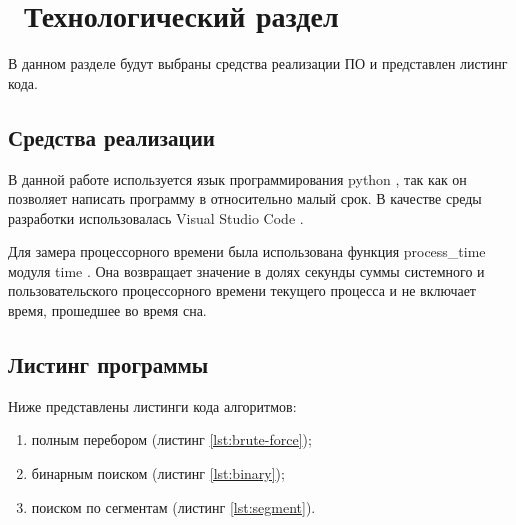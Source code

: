 \chapter{ Технологический раздел}
\label{cha:technological}

    В данном разделе будут выбраны средства реализации ПО и представлен листинг кода. 

    \section{Средства реализации}
        В данной работе используется язык программирования python \cite{python}, так как
        он позволяет написать программу в относительно малый срок.
        В качестве среды разработки использовалась Visual Studio Code \cite{visual-studio-code}. 

        Для замера процессорного времени была использована функция process\_time модуля time \cite{process_time}. 
        Она возвращает значение в долях секунды суммы системного и пользовательского процессорного времени текущего процесса и 
        не включает время, прошедшее во время сна.

    \section{Листинг программы}
        Ниже представлены листинги кода алгоритмов:
        \begin{enumerate}
            \item полным перебором (листинг \ref{lst:brute-force});
            \item бинарным поиском (листинг \ref{lst:binary});
            \item поиском по сегментам (листинг \ref{lst:segment}).
        \end{enumerate}
        
        \begin{lstlisting}[language=python, label=lst:brute-force, caption=Реализация алгоритма поиска слов в словаре полным перебором]

        \end{lstlisting}

        \begin{lstlisting}[language=python, label=lst:binary, caption=Реализация алгоритма двоичного поиска слова в словаре]

        \end{lstlisting}

        \begin{lstlisting}[language=python, label=lst:segment, caption=Реализация алгоритма поиска слова в словаре по сегментам]
        \end{lstlisting}
    
